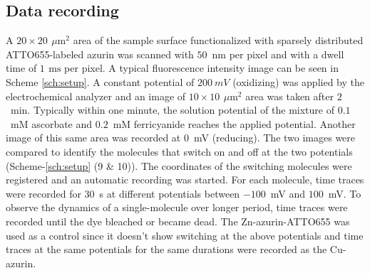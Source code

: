 \documentclass[journal=jacsat,manuscript=article]{achemso}
\newcommand{\um}{\ensuremath{\,\mu\textrm{m}}}
\newcommand{\ms}{\ensuremath{\,\textrm{ms}}}
\begin{document}
\subsection{Data recording}
A $20\times20~\um^2$ area of the sample surface functionalized with sparsely distributed ATTO655-labeled azurin was scanned with $50$~nm per pixel and with a dwell time of $1~\ms$ per pixel. A typical fluorescence intensity image can be seen in Scheme \ref{sch:setup}. A constant potential of $200~mV$ (oxidizing) was applied by the electrochemical analyzer and an image of $10\times10~\um^2$ area was taken after $2$~min. Typically within one minute, the solution potential of the mixture of $0.1$~mM ascorbate and $0.2$~mM ferricyanide reaches the applied potential. Another image of this same area was recorded at $0$~mV (reducing). The two images were compared to identify the molecules that switch on and off at the two potentials (Scheme-\ref{sch:setup} (9 \& 10)). The coordinates of the switching molecules were registered and an automatic recording was started. For each molecule, time traces were recorded for $30$~s at different potentials between $-100$~mV and $100$~mV. To observe the dynamics of a single-molecule over longer period, time traces were recorded until the dye  bleached or became dead. The Zn-azurin-ATTO655 was used as a control since it doesn't show switching at the above potentials and time traces at the same potentials for the same durations were recorded as the Cu-azurin.
\end{document}
